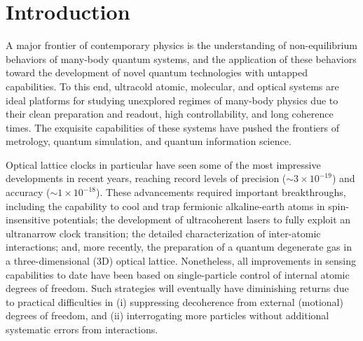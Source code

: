 \documentclass[aps,prx,superscriptaddress,notitlepage,twocolumn,longbibliography]{revtex4-2}
\begin{document}
\section{Introduction}

A major frontier of contemporary physics is the understanding of non-equilibrium behaviors of many-body quantum systems, and the application of these behaviors toward the development of novel quantum technologies with untapped capabilities\cite{eisert2015quantum}.
To this end, ultracold atomic, molecular, and optical systems are ideal platforms for studying unexplored regimes of many-body physics due to their clean preparation and readout, high controllability, and long coherence times\cite{bloch2008manybody, gross2017quantum}.
The exquisite capabilities of these systems have pushed the frontiers of metrology, quantum simulation, and quantum information science.

Optical lattice clocks in particular have seen some of the most impressive developments in recent years, reaching record levels of precision ($\sim 3\times 10^{-19}$)\cite{campbell2017fermidegenerate, marti2018imaging} and accuracy ($\sim 1\times 10^{-18}$)\cite{bloom2014optical, mcgrew2018atomic}.
These advancements required important breakthroughs, including the capability to cool and trap fermionic alkaline-earth atoms in spin-insensitive potentials\cite{takamoto2003spectroscopy, barber2006direct, ye2008quantum}; the development of ultracoherent lasers\cite{kessler2012sub40mhzlinewidth, cole2013tenfold, matei2017mu} to fully exploit an ultranarrow clock transition\cite{ludlow2015optical}; the detailed characterization of inter-atomic interactions\cite{scazza2014observation, cappellini2014direct, zhang2014spectroscopic}; and, more recently, the preparation of a quantum degenerate gas in a three-dimensional (3D) optical lattice\cite{campbell2017fermidegenerate, marti2018imaging, goban2018emergence}.
Nonetheless, all improvements in sensing capabilities to date have been based on single-particle control of internal atomic degrees of freedom.
Such strategies will eventually have diminishing returns due to practical difficulties in (i) suppressing decoherence from external (motional) degrees of freedom, and (ii) interrogating more particles without additional systematic errors from interactions\cite{martin2013quantum, ludlow2015optical, marti2018imaging}.
\end{document}
